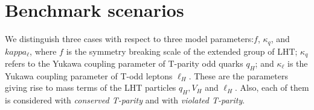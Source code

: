 %  
% 
% 
%  
% 
% 
% 



\section{Benchmark scenarios}

We distinguish three cases with respect to three model parameters:$f$, $\kappa_q$, and $kappa_\ell$, where $f$ is the symmetry breaking scale of the extended group of LHT;
$\kappa_q$ refers to the Yukawa coupling parameter of T-parity odd quarks $q_H$; and $\kappa_\ell$ is the Yukawa coupling parameter of T-odd leptons $\ell_H$. 
These are the parameters giving rise to mass terms of the LHT particles $q_H, V_H$ and $\ell_H$.
Also, each of them is considered with \emph{conserved T-parity} and with \emph{violated T-parity}. 


